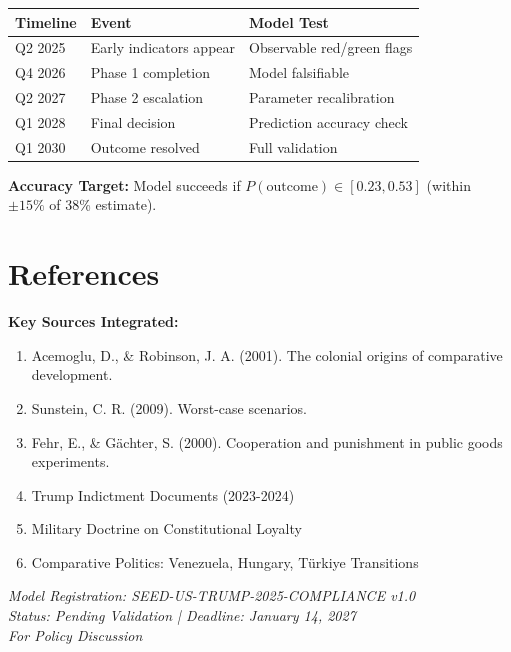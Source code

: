 \begin{table}[h]
\centering
\begin{tabular}{|l|l|l|}
\hline
\textbf{Timeline} & \textbf{Event} & \textbf{Model Test} \\
\hline
Q2 2025 & Early indicators appear & Observable red/green flags \\
Q4 2026 & Phase 1 completion & Model falsifiable \\
Q2 2027 & Phase 2 escalation & Parameter recalibration \\
Q1 2028 & Final decision & Prediction accuracy check \\
Q1 2030 & Outcome resolved & Full validation \\
\hline
\end{tabular}
\end{table}

\textbf{Accuracy Target:} Model succeeds if $P(\text{outcome}) \in [0.23, 0.53]$ (within $\pm 15\%$ of 38\% estimate).


\section{References}

\nocite{bcm_master}

\textbf{Key Sources Integrated:}
\begin{enumerate}
\item Acemoglu, D., \& Robinson, J. A. (2001). The colonial origins of comparative development.
\item Sunstein, C. R. (2009). Worst-case scenarios.
\item Fehr, E., \& Gächter, S. (2000). Cooperation and punishment in public goods experiments.
\item Trump Indictment Documents (2023-2024)
\item Military Doctrine on Constitutional Loyalty
\item Comparative Politics: Venezuela, Hungary, Türkiye Transitions
\end{enumerate}

\vspace{2cm}

\begin{center}
\textit{Model Registration: SEED-US-TRUMP-2025-COMPLIANCE v1.0} \\
\textit{Status: Pending Validation | Deadline: January 14, 2027} \\
\textit{For Policy Discussion}
\end{center}


